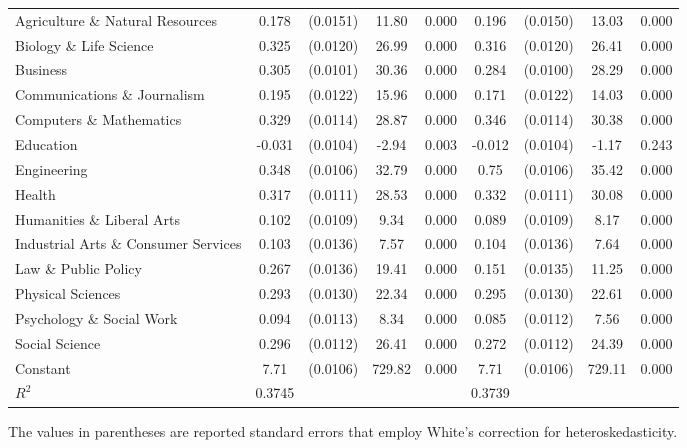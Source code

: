 \documentclass[11pt]{article}
\theoremstyle{definition}
\begin{document}
{\begin{center}
\begin{tabular}{l c c c c c c c c}
Agriculture \& Natural Resources & 0.178 & (0.0151) & 11.80 & 0.000 & 0.196 & (0.0150) & 13.03 & 0.000 \\
Biology \& Life Science & 0.325 & (0.0120) & 26.99 & 0.000 & 0.316 & (0.0120) & 26.41 & 0.000 \\
Business & 0.305 & (0.0101) & 30.36 & 0.000 & 0.284 & (0.0100) & 28.29 & 0.000 \\
Communications \& Journalism & 0.195 & (0.0122) & 15.96 & 0.000 & 0.171 & (0.0122) & 14.03 & 0.000 \\
Computers \& Mathematics & 0.329 & (0.0114) & 28.87 & 0.000  & 0.346 & (0.0114) & 30.38 & 0.000 \\
Education & -0.031 & (0.0104) & -2.94 & 0.003  & -0.012 & (0.0104) & -1.17 & 0.243 \\
Engineering & 0.348 & (0.0106) & 32.79 & 0.000 & 0.75 & (0.0106) & 35.42 & 0.000 \\
Health & 0.317 & (0.0111) & 28.53 & 0.000 & 0.332 & (0.0111) & 30.08 & 0.000 \\
Humanities \& Liberal Arts & 0.102 & (0.0109) & 9.34 & 0.000 & 0.089 & (0.0109) & 8.17 & 0.000 \\
Industrial Arts \& Consumer Services & 0.103 & (0.0136) & 7.57 & 0.000 & 0.104 & (0.0136) & 7.64 & 0.000 \\
Law \& Public Policy & 0.267 & (0.0136) & 19.41 & 0.000 & 0.151 & (0.0135) & 11.25 & 0.000 \\
Physical Sciences & 0.293 & (0.0130) & 22.34 & 0.000 & 0.295 & (0.0130) & 22.61 & 0.000 \\
Psychology \& Social Work & 0.094 & (0.0113) & 8.34 & 0.000 & 0.085 & (0.0112) & 7.56 & 0.000 \\
Social Science & 0.296 & (0.0112) & 26.41 & 0.000 & 0.272 & (0.0112) & 24.39 & 0.000 \\
Constant & 7.71 & (0.0106) & 729.82 & 0.000 & 7.71 & (0.0106) & 729.11 & 0.000 \\
\hline
$R^2$ & 0.3745 & & & & 0.3739 & & \\
\hline\hline
\end{tabular} 
\end{center}} 
\hspace{12mm} \small{The values in parentheses are reported standard errors that employ White's correction for heteroskedasticity.} 
\end{document}
